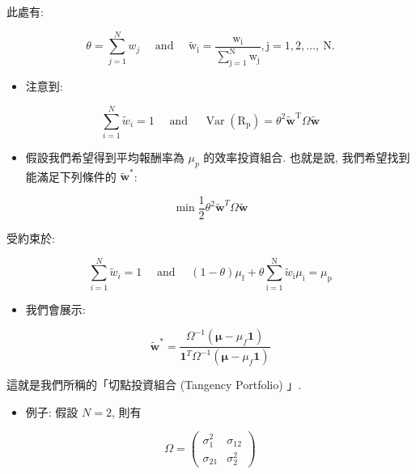 \documentclass[letterpaper]{article}
\begin{document}
		此處有: 
		
		$$
		\theta=\sum_{j=1}^{N} w_{j} \quad \text { and } \quad \tilde{\mathrm{w}}_{\mathrm{i}}=\frac{\mathrm{w}_{\mathrm{i}}}{\sum_{\mathrm{j}=1}^{\mathrm{N}} \mathrm{w}_{\mathrm{j}}}, \mathrm{j}=1, 2, \ldots, \mathrm{~N} .
		$$
		
		\begin{itemize}
			\item 注意到: 
		\end{itemize}
		
		$$
		\sum_{i=1}^{N} \tilde{w}_{i}=1 \quad \text { and } \quad \operatorname{Var}\left (\mathrm{R}_{\mathrm{p}}\right) =\theta^{2} \tilde{\mathbf{w}}^{\mathrm{T}} \Omega \tilde{\mathbf{w}}
		$$
		
		\begin{itemize}
			\item 假設我們希望得到平均報酬率為 $\mu_{p}$ 的效率投資組合. 也就是說, 我們希望找到能滿足下列條件的 $\tilde{\mathbf{w}}^{*}$: 
			
		\end{itemize}
		
		$$
		\min \frac{1}{2} \theta^{2} \tilde{\mathbf{w}}^{T} \Omega \tilde{\mathbf{w}}
		$$
		
		受約束於: 
		
		$$
		\sum_{i=1}^{N} \tilde{w}_{i}=1 \quad \text { and } \quad (1-\theta) \mu_{\mathrm{f}}+\theta \sum_{\mathrm{i}=1}^{\mathrm{N}} \tilde{w}_{\mathrm{i}} \mu_{\mathrm{i}}=\mu_{\mathrm{p}}
		$$
		
		\begin{itemize}
			\item 我們會展示: 
		\end{itemize}
		
		$$
		\tilde{\mathbf{w}}^{*}=\frac{\Omega^{-1}\left (\boldsymbol{\mu}-\mu_{f} \mathbf{1}\right) }{\mathbf{1}^{T} \Omega^{-1}\left (\boldsymbol{\mu}-\mu_{f} \mathbf{1}\right) }
		$$
		
		這就是我們所稱的「切點投資組合 (Tangency Portfolio) 」. 
		
		\begin{itemize}
			\item 例子: 假設 $N=2$, 則有
		\end{itemize}
		
		
		$$
		\Omega=\left (\begin{array}{cc}
			\sigma_{1}^{2} & \sigma_{12} \\
			\sigma_{21} & \sigma_{2}^{2}
		\end{array}\right) 
		$$
		
\end{document}
